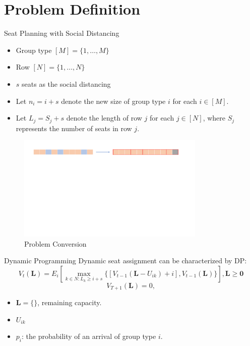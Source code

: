 
\section{Problem Definition}
    \frame{\sectionpage}

    \begin{frame}{Seat Planning with Social Distancing}
      \begin{itemize}
      \item Group type $[M] = \{1, \ldots, M\}$
      \item Row $[N] = \{1, \ldots, N\}$
      \item $s$ seats as the social distancing
      \item Let $n_i = i + s$ denote the new size of group type $i$ for each $i \in [M]$.
      \item Let $L_j = S_j + s$ denote the length of row $j$ for each $j \in [N]$, where $S_j$ represents the number of seats in row $j$.
      \end{itemize}
      
      \begin{figure}[ht]
        \centering
        \includegraphics[width = 0.8\textwidth]{./images/dummy_seat.pdf}
        \caption{Problem Conversion}
    \end{figure}
    \end{frame}

    \begin{frame}{Dynamic Programming}
      \centering
      Dynamic seat assignment can be characterized by DP:
      $$V_{t}(\mathbf{L}) = E_{i} \left[ \max_{k \in N: L_k \geq i + s} \{ {[V_{t-1}(\mathbf{L}- U_{ik})+ i]}, {V_{t-1}(\mathbf{L})}\} \right], \mathbf{L} \geq \mathbf{0}$$
      $$V_{T+1}(\mathbf{L}) = 0,$$

      \begin{itemize}
        \item $\mathbf{L} = \{  \}$, remaining capacity.
        \vspace{10pt}
        \item $U_{ik}$
        \vspace{10pt}
        \item $p_i$: the probability of an arrival of group type $i$.
      \end{itemize}
  \end{frame}


